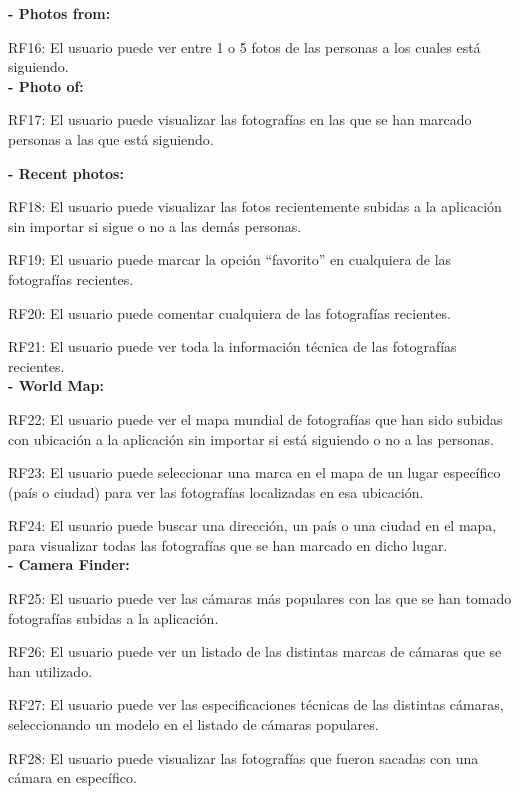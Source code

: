 \documentclass{memoria}
\begin{document}

\textbf{- Photos from:} 

RF16: El usuario puede  ver entre 1 o 5 fotos de las personas a los cuales está siguiendo.\\

\textbf{- Photo of:} 

RF17: El usuario puede visualizar las fotografías en las que se han marcado personas a las que está siguiendo.\\


\textbf{- Recent photos:}

RF18: El usuario puede visualizar las fotos recientemente subidas a la aplicación sin importar si sigue o no a las demás personas.

RF19: El usuario puede marcar la opción “favorito” en cualquiera de las fotografías recientes.

RF20: El usuario puede comentar cualquiera de las fotografías recientes.

RF21: El usuario puede ver toda la información técnica de las fotografías recientes.\\

\textbf{- World Map:}

RF22: El usuario puede ver el mapa mundial de fotografías que han sido subidas con ubicación a la aplicación sin importar si está siguiendo o no a las personas.

RF23: El usuario puede seleccionar una marca en el mapa de un lugar específico (país o ciudad) para ver las fotografías localizadas en esa ubicación.

RF24: El usuario puede buscar una dirección, un país o una ciudad  en el mapa, para visualizar todas las fotografías que se han marcado en dicho lugar.\\

\textbf{- Camera Finder:}

RF25: El usuario puede ver las cámaras más populares con las que se han tomado fotografías subidas a la aplicación.

RF26: El usuario puede ver un listado de las distintas marcas de cámaras que se han utilizado.

RF27: El usuario puede ver las especificaciones técnicas de las distintas cámaras, seleccionando un modelo en el listado de cámaras populares.

RF28: El usuario puede visualizar las fotografías que fueron sacadas con una cámara en específico.\\
\end{document}
